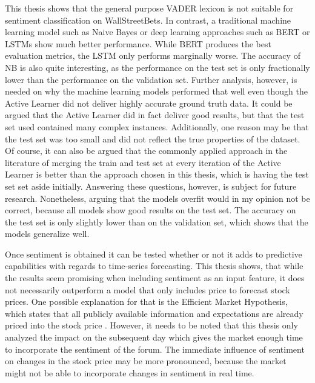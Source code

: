 \documentclass[11pt, a4paper]{article}
\begin{document}
This thesis shows that the general purpose VADER lexicon is not suitable for sentiment classification on WallStreetBets.
In contrast, a traditional machine learning model such as Naive Bayes or deep learning approaches such as BERT or LSTMs
show much better performance. While BERT produces the best evaluation metrics, the LSTM only performs marginally worse.
The accuracy of NB is also quite interesting, as the performance on the test set is only fractionally lower than the performance
on the validation set.
Further analysis, however, is needed on why the machine learning models performed that well even 
though the Active Learner did not deliver highly accurate ground truth data. 
It could be argued that the Active Learner did in fact deliver good results, but that the test set used contained many
complex instances.
Additionally, one reason may be that the test set was too small and did not reflect the true properties of the dataset.
Of course, it can also be argued that the commonly applied approach in the literature of merging the train and test set at 
every iteration of the Active Learner is better than the approach chosen in this thesis, which is having the test set set aside initially.
Answering these questions, however, is subject for future research.
Nonetheless, arguing that the models overfit would in my opinion not be correct, because all models show good results on the test set.
The accuracy on the test set is only slightly lower than on the validation set, which shows that the models generalize well.


Once sentiment is obtained it can be tested whether or not it adds to predictive capabilities with regards to time-series forecasting.
This thesis shows, that while the results seem promising when including sentiment as an input feature, it does not necessarily outperform a
model that only includes price to forecast stock prices. One possible explanation for that is the Efficient Market Hypothesis, which states
that all publicly available information and expectations are already priced into the stock price \citep{fama1970emh}.
However, it needs to be noted that this thesis only analyzed the impact on the subsequent day which gives the market enough time to incorporate
the sentiment of the forum. The immediate influence of sentiment on changes in the stock price may be more pronounced, because the market might
not be able to incorporate changes in sentiment in real time.



\newpage
\end{document}
